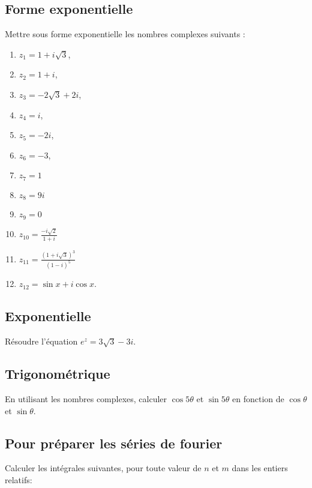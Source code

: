\vspace{2em}

\subsection{Forme exponentielle}
Mettre sous forme exponentielle les nombres complexes suivants : 
\begin{multicols}{3}
\begin{enumerate}
    \item $z_1=1+i \sqrt{3}$, 
    \item $z_2=1+i$, 
    \item $z_3=-2 \sqrt{3}+2 i$, 
    \item $z_4=i$, 
    \item $z_5=-2 i$, 
    \item $z_6=-3$,
    \item $z_7=1$
    \item $z_8=9 i$
    \item $z_9=0$
    \item $z_{10}=\frac{-i \sqrt{2}}{1+i}$
    \item $z_{11}=\frac{(1+i \sqrt{3})^3}{(1-i)^5}$
    \item $z_{12}=\sin x+i \cos x$.
\end{enumerate}
\end{multicols}



\vspace{2em}

\subsection{Exponentielle}
Résoudre l'équation $e^z=3 \sqrt{3}-3 i$.

\newpage

\subsection{Trigonométrique}
En utilisant les nombres complexes, calculer  $\cos 5 \theta$ et $\sin 5 \theta$ en fonction de $\cos \theta$ et $\sin \theta$.

\vspace{2em}


\subsection{Pour préparer les séries de fourier}
Calculer les intégrales suivantes, pour toute valeur de $n$ et $m$ dans les entiers relatifs:

